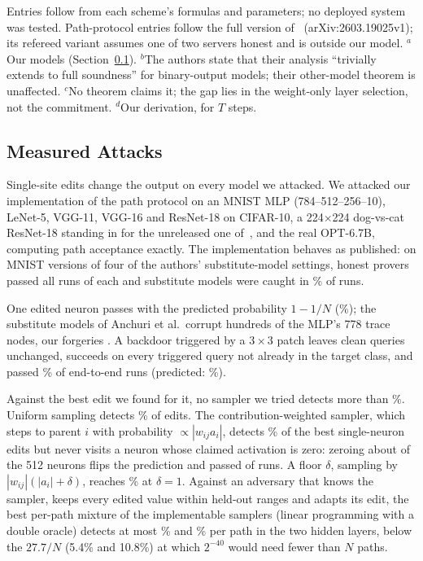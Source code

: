\begin{table}[t]
  \smallskip
  {\footnotesize Entries follow from each scheme's formulas and parameters; no deployed
  system was tested. Path-protocol entries follow the full version of~\cite{anchuri2026verifiable}
  (arXiv:2603.19025v1); its refereed variant assumes one of two servers honest and is outside our model. $^a$Our models
  (Section~\ref{sec:break}). $^b$The
  authors state that their analysis ``trivially extends to full soundness'' for binary-output
  models; their other-model theorem is unaffected. $^c$No theorem claims it; the gap lies in the
  weight-only layer selection, not the commitment. $^d$Our derivation, for $T$ steps.}
\end{table}

\subsection{Measured Attacks}
\label{sec:break}

Single-site edits change the output on every model we attacked. We attacked our implementation of the path protocol on an MNIST MLP (784--512--256--10), LeNet-5,
VGG-11, VGG-16 and ResNet-18 on CIFAR-10, a 224$\times$224 dog-vs-cat ResNet-18 standing in for
the unreleased one of~\cite{anchuri2026verifiable}, and the real OPT-6.7B, computing path
acceptance exactly. The implementation behaves as published: on MNIST versions of four of the authors'
substitute-model settings, honest provers passed all \ReproRuns{} runs of each and substitute models were caught in
\ReproCaught{}\% of runs.

 One edited neuron passes with the predicted probability $1-1/N$ (\MnistSinglePass{}\%);
the substitute models of Anchuri et al.\ corrupt hundreds of the MLP's 778 trace nodes, our
forgeries \MnistForgeryNodes{}. A backdoor triggered by a $3{\times}3$ patch leaves clean queries unchanged,
succeeds on every triggered query not already in the target class, and passed \MnistBackdoorPass{}\% of \MnistBackdoorRuns{}
end-to-end runs (predicted: \MnistBackdoorPredicted{}\%).

 Against the best edit we found for it, no sampler we tried detects more
than \FloorBest{}\%. Uniform sampling detects
\SamplerUniform{}\% of edits. The contribution-weighted
sampler, which steps to parent $i$ with probability $\propto|w_{ij}a_i|$, detects \SamplerContribution{}\% of
the best single-neuron edits but never visits a neuron whose claimed activation is zero:
zeroing about \ZeroingNeurons{} of the 512 neurons flips the prediction and passed \ZeroingAccepts{} of \ZeroingRuns{} runs. A
floor $\delta$, sampling by $|w_{ij}|(|a_i|+\delta)$, reaches \FloorBest{}\% at $\delta=1$. Against an adversary that knows the sampler, keeps
every edited value within held-out ranges and adapts its edit, the best per-path mixture of the
implementable samplers (linear programming with a double oracle) detects at most \MixtureLayerOne{}\% and
\MixtureLayerTwo{}\% per path in the two hidden layers, below the $27.7/N$ (5.4\% and 10.8\%) at
which $2^{-40}$ would need fewer than $N$ paths.

